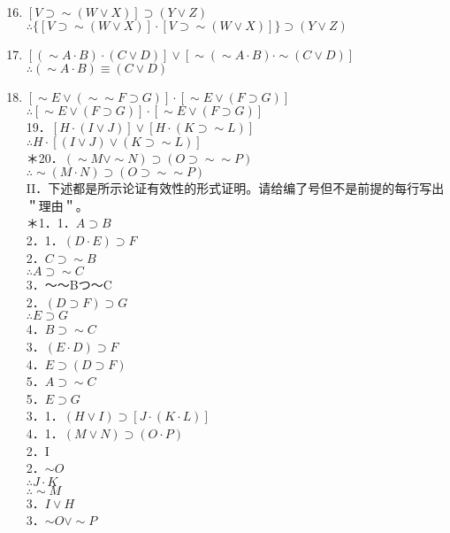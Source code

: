 \begin{enumerate}
  \setcounter{enumi}{15}
  \item $[V \supset \sim(W \vee X)] \supset(Y \vee Z)$\\
$\therefore\{[V \supset \sim(W \vee X)] \cdot[V \supset \sim(W \vee X)]\} \supset(Y \vee Z)$
  \item $[(\sim A \cdot B) \cdot(C \vee D)] \vee[\sim(\sim A \cdot B) \cdot \sim(C \vee D)]$\\
$\therefore(\sim A \cdot B) \equiv(C \vee D)$
  \item $[\sim E \vee(\sim \sim F \supset G)] \cdot[\sim E \vee(F \supset G)]$\\
$\therefore[\sim E \vee(F \supset G)] \cdot[\sim E \vee(F \supset G)]$\\
19．$[H \cdot(I \vee J)] \vee[H \cdot(K \supset \sim L)]$\\
$\therefore H \cdot[(I \vee J) \vee(K \supset \sim L)]$\\
＊20．$(\sim M \vee \sim N) \supset(O \supset \sim \sim P)$\\
$\therefore \sim(M \cdot N) \supset(O \supset \sim \sim P)$\\
II．下述都是所示论证有效性的形式证明。请给编了号但不是前提的每行写出＂理由＂。\\
＊1．1．$A \supset B$\\
2．1．$(D \cdot E) \supset F$\\
2．$C \supset \sim B$\\
$\therefore A \supset \sim C$\\
3．～～Bつ～C\\
2．$(D \supset F) \supset G$\\
$\therefore E \supset G$\\
4．$B \supset \sim C$\\
3．$(E \cdot D) \supset F$\\
4．$E \supset(D \supset F)$\\
5．$A \supset \sim C$\\
5．$E \supset G$\\
3．1．$(H \vee I) \supset[J \cdot(K \cdot L)]$\\
4．1．$(M \vee N) \supset(O \cdot P)$\\
2．I\\
2．$\sim O$\\
$\therefore J \cdot K$\\
$\therefore \sim M$\\
3．$I \vee H$\\
3．$\sim O \vee \sim P$\\

\end{enumerate}

